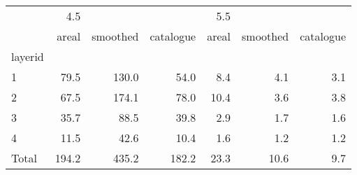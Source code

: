 \begin{tabular}{lrrrrrr}
\toprule
{} &    4.5 &          &           &   5.5 &          &           \\
{} &  areal & smoothed & catalogue & areal & smoothed & catalogue \\
\midrule
layerid &        &          &           &       &          &           \\
1       &   79.5 &    130.0 &      54.0 &   8.4 &      4.1 &       3.1 \\
2       &   67.5 &    174.1 &      78.0 &  10.4 &      3.6 &       3.8 \\
3       &   35.7 &     88.5 &      39.8 &   2.9 &      1.7 &       1.6 \\
4       &   11.5 &     42.6 &      10.4 &   1.6 &      1.2 &       1.2 \\
Total   &  194.2 &    435.2 &     182.2 &  23.3 &     10.6 &       9.7 \\
\bottomrule
\end{tabular}

